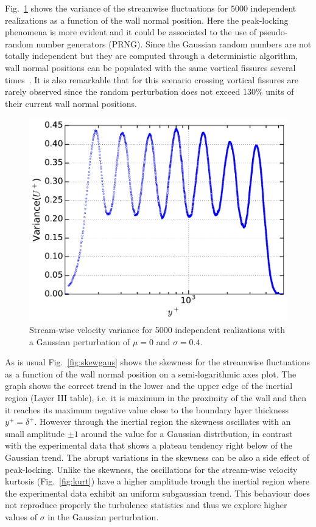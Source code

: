 \documentclass[aps,reprint,amsmath,amssymb,pra]{revtex4-1}%
\begin{document}
Fig.~\ref{fig:varigaus} shows the variance of the streamwise fluctuations for $5000$ independent realizations as a function of the wall normal position. Here the peak-locking phenomena is more evident and it could be associated to the use of pseudo-random number generators (PRNG). Since the Gaussian random numbers are not totally independent but they are computed through a deterministic algorithm, wall normal positions can be populated with the same vortical fissures several times~\cite{nm}. It is also remarkable that for this scenario crossing vortical fissures are rarely observed since the random perturbation does not exceed $130\%$ units of their current wall normal positions. 

\begin{figure}[tb]
\includegraphics[scale=0.46]{figures/variance_5000_assembles}
\caption{\label{fig:varigaus} Stream-wise velocity variance for 5000 independent realizations with a Gaussian perturbation of $\mu=0$ and $\sigma=0.4$.}
\end{figure}
As is usual Fig.~\ref{fig:skewgaus} shows the skewness for the streamwise fluctuations as a function of the wall normal position on a semi-logarithmic axes plot. The graph shows the correct trend in the lower and the upper edge of the inertial region (Layer III table), i.e. it is maximum in the proximity of the wall and then it reaches its maximum negative value close to the boundary layer thickness $y^+=\delta^+$. However through the inertial region the skewness oscillates with an small amplitude $\pm 1$ around the value for a Gaussian distribution, in contrast with the experimental data that shows a plateau tendency right below of the Gaussian trend. The abrupt variations in the skewness can be also a side effect of peak-locking. Unlike the skewness, the oscillations for the stream-wise velocity kurtosis (Fig.~\ref{fig:kurt}) have a higher amplitude trough the inertial region where the experimental data exhibit an uniform subgaussian trend. This behaviour does not reproduce properly the turbulence statistics and thus we explore higher values of $\sigma$ in the Gaussian perturbation.
\end{document}
